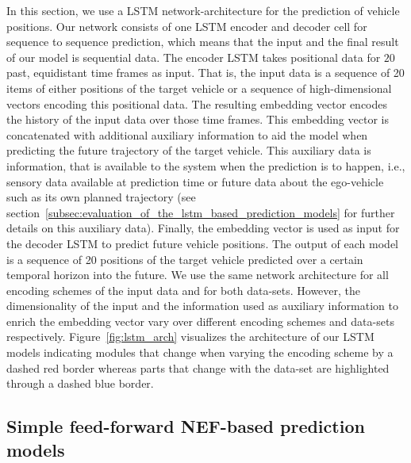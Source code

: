 In this section, we use a \acf{LSTM} \parencite{Hochreiter1997} network-architecture for the prediction of vehicle positions.
Our network consists of one \ac{LSTM} encoder and decoder cell for sequence to sequence prediction, which means that the input and the final result of our model is sequential data.
The encoder \ac{LSTM} takes positional data for $20$ past, equidistant time frames as input.
That is, the input data is a sequence of \num{20} items of either positions of the target vehicle or a sequence of high-dimensional vectors encoding this positional data.
The resulting embedding vector encodes the history of the input data over those time frames.
This embedding vector is concatenated with additional auxiliary information to aid the model when predicting the future trajectory of the target vehicle.
This auxiliary data is information, that is available to the system when the prediction is to happen, i.e., sensory data available at prediction time or future data about the ego-vehicle such as its own planned trajectory (see section~\ref{subsec:evaluation_of_the_lstm_based_prediction_models} for further details on this auxiliary data).
Finally, the embedding vector is used as input for the decoder \ac{LSTM} to predict future vehicle positions.
The output of each model is a sequence of \num{20} positions of the target vehicle predicted over a certain temporal horizon into the future.
We use the same network architecture for all encoding schemes of the input data and for both data-sets.
However, the dimensionality of the input and the information used as auxiliary information to enrich the embedding vector vary over different encoding schemes and data-sets respectively.
Figure~\ref{fig:lstm_arch} visualizes the architecture of our \ac{LSTM} models indicating modules that change when varying the encoding scheme by a dashed red border whereas parts that change with the data-set are highlighted through a dashed blue border.

\subsection{Simple feed-forward \acs{NEF}-based prediction models}%
\label{subsec:simple_feed_forward_nef_based_prediction_models}


